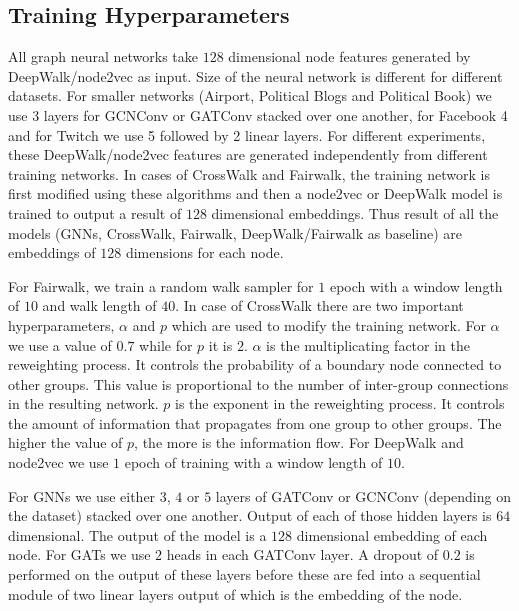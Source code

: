 \documentclass{article}
\theoremstyle{plain}
\theoremstyle{definition}
\theoremstyle{remark}
\begin{document}
\subsection{Training Hyperparameters}

All graph neural networks take $128$ dimensional node features generated by DeepWalk/node2vec as input. Size of the neural network is different for different datasets. For smaller networks (Airport, Political Blogs and Political Book) we use 3 layers for GCNConv or GATConv stacked over one another, for Facebook 4 and for Twitch we use 5 followed by 2 linear layers. For different experiments, these DeepWalk/node2vec features are generated independently from different training networks. 
In cases of CrossWalk and Fairwalk, the training network is first modified using these algorithms and then a node2vec or DeepWalk model is trained to output a result of $128$ dimensional embeddings. Thus result of all the models (GNNs, CrossWalk, Fairwalk, DeepWalk/Fairwalk as baseline) are embeddings of $128$ dimensions for each node.

For Fairwalk, we train a random walk sampler for $1$ epoch with a window length of $10$ and walk length of $40$. In case of CrossWalk there are two important hyperparameters, $\alpha$ and $p$ which are used to modify the training network. For $\alpha$ we use a value of $0.7$ while for $p$ it is $2$. $\alpha$ is the multiplicating factor in the reweighting process. It controls the probability of a boundary node connected to other groups. This value is proportional to the number of inter-group connections in the resulting network. $p$ is the exponent in the reweighting process. It controls the amount of information that propagates from one group to other groups. The higher the value of $p$, the more is the information flow. For DeepWalk and node2vec we use $1$ epoch of training with a window length of $10$.

For GNNs we use either $3$, $4$ or $5$ layers of GATConv or GCNConv (depending on the dataset) stacked over one another. Output of each of those hidden layers is $64$ dimensional. The output of the model is a $128$ dimensional embedding of each node. For GATs we use $2$ heads in each GATConv layer. A dropout of $0.2$ is performed on the output of these layers before these are fed into a sequential module of two linear layers output of which is the embedding of the node. 
\end{document}
